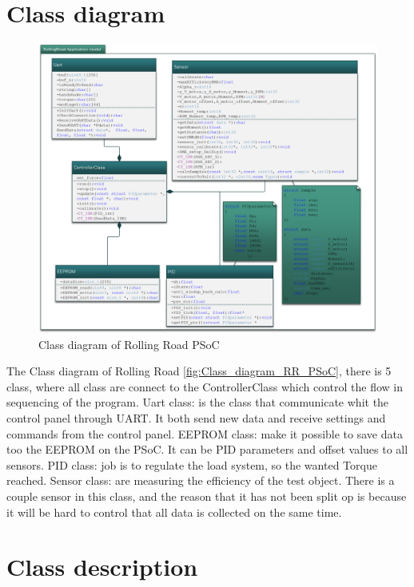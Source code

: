 \section{Class diagram}

\begin{figure}[H]
	\centering
	\includegraphics [width=6in]{Software/Pictures/klassediagram.png}
	\caption{Class diagram of Rolling Road PSoC}
	\label{fig:Class_diagram_RR_PSoC}
\end{figure}

The Class diagram of Rolling Road \vref{fig:Class_diagram_RR_PSoC}, there is 5 class, where all class are connect to the ControllerClass which control the flow in sequencing of the program.
Uart class: is the class that communicate whit the control panel through UART. It both send new data and receive settings and commands from the control panel. 
EEPROM class: make it possible to save data too the EEPROM on the PSoC. It can be PID parameters and offset values to all sensors.
PID class: job is to regulate the load system, so the wanted Torque reached. 
Sensor class: are measuring the efficiency of the test object. There is a couple sensor in this class, and the reason that it has not been split op is because it will be hard to control that all data is collected on the same time.

\section{Class description}


